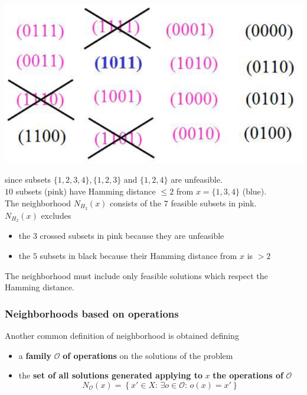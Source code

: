 \documentclass[11pt]{article}
\begin{document}
	\begin{center}
		\includegraphics[width=0.6\columnwidth]{img/KPN1}
	\end{center}
	
	since subsets $\{1, 2, 3, 4\}, \{1, 2, 3\}$ and $\{1, 2, 4\}$ are unfeasible.\\
	
	$10$ subsets (pink) have Hamming distance $\leq 2$ from $x = \{1, 3, 4\}$ (blue).\\
	
	The neighborhood $N_{H_2} (x)$ consists of the $7$ feasible subsets in pink.\\
	$N_{H_2} (x)$ excludes
	\begin{itemize}
		\item the $3$ crossed subsets in pink because they are unfeasible
		
		\item the $5$ subsets in black because their Hamming distance from $x$ is $> 2$
	\end{itemize}
	
	The neighborhood must include only feasible solutions which respect the Hamming distance.\\
	
	\newpage
	
	\subsubsection{Neighborhoods based on operations}
	
	Another common definition of neighborhood is obtained defining
	\begin{itemize}
		\item a \textbf{family} $\mathcal{O}$ \textbf{of operations} on the solutions of the problem
		
		\item the \textbf{set of all solutions generated applying to} $x$ \textbf{the operations of} $\mathcal{O}$
		$$ N_{\mathcal{O}} (x) = \left\{x' \in X : \, \exists o \in \mathcal{O}: \, o (x) = x' \right\} $$
	\end{itemize}
	
\end{document}
